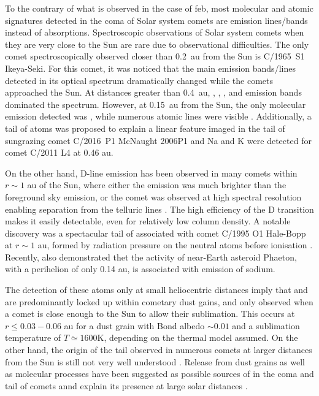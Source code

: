 \documentclass{aa}
\begin{document}
To the contrary of what is observed in the case of \ac{feb}, most molecular and atomic signatures detected in the coma of Solar system comets are emission lines/bands instead of absorptions.
%
Spectroscopic observations of Solar system comets when they are very close to the Sun are rare due to observational difficulties.
%
The only comet spectroscopically observed closer than 0.2~au from the Sun is C/1965~S1 Ikeya-Seki.
%
For this comet, it was noticed that the main emission bands/lines detected in its optical spectrum dramatically changed while the comets approached the Sun.
%
At distances greater than 0.4~au, , , , and  emission bands dominated the spectrum.
%
However, at 0.15~au from the Sun, the only molecular emission detected was , while numerous atomic lines were visible \citep[, , , , , , , , , ; ][]{Dufay65,Thackeray1966,Preston1967,Slaughter1969}.
%
Additionally, a tail of  atoms was proposed to explain a linear feature imaged in the tail of sungrazing comet C/2016~P1 McNaught 2006P1 \citep{Fulle2007} and Na and K were detected for comet C/2011 L4 \citep{Fulle13} at 0.46 au. 

On the other hand,  D-line emission has been observed in many comets within $r \sim 1$ au of the Sun, where either the emission was much brighter than the foreground sky emission, or the comet was observed at high spectral resolution enabling separation from the telluric lines \citep{Cremonese02,Schmidt16}.
%
The high efficiency of the  D transition makes it easily detectable, even for relatively low column density.
%
A notable discovery was a spectacular tail of  associated with comet C/1995 O1 Hale-Bopp at $r\sim 1$ au, formed by radiation pressure on the neutral atoms before ionisation \citep{Cremonese1997}. 
Recently, \cite{Hui2023} also demonstrated thet the activity of near-Earth asteroid Phaeton, with a perihelion of only 0.14 au, is associated with emission of sodium. 

The detection of these atoms only at small heliocentric distances imply that  and  are predominantly locked up within cometary dust gains, and only observed when a comet is close enough to the Sun to allow their sublimation.
%
This occurs at $r\leq 0.03-0.06$ au for a dust grain with Bond albedo $\sim0.01$ and a sublimation temperature of $T\simeq 1600$K, depending on the thermal model assumed.
%
On the other hand, the origin of the  tail observed in numerous comets at larger distances from the Sun is still not very well understood \citep{Cremonese02}.
%
Release from dust grains as well as molecular processes have been suggested as possible sources of  in the coma and tail of comets annd explain its presence at large solar distances \citep{Cremonese1997}.
\end{document}
